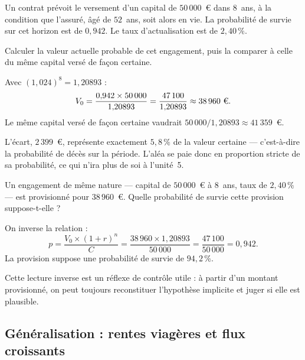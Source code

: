 \begin{exercice}
Un contrat prévoit le versement d'un capital de $50\,000$~\euro{} dans $8$~ans,
à la condition que l'assuré, âgé de $52$~ans, soit alors en vie. La probabilité
de survie sur cet horizon est de $0{,}942$. Le taux d'actualisation est de
$2{,}40\,\%$.

Calculer la valeur actuelle probable de cet engagement, puis la comparer à celle
du même capital versé de façon certaine.
\end{exercice}

\begin{corrige}
Avec $(1{,}024)^{8} = 1{,}20893$ :
\[
  V_0 = \frac{0{,}942 \times 50\,000}{1{,}20893}
      = \frac{47\,100}{1{,}20893} \approx 38\,960\ \text{\euro}.
\]
Le même capital versé de façon certaine vaudrait
$50\,000/1{,}20893 \approx 41\,359$~\euro.

\medskip
L'écart, $2\,399$~\euro, représente exactement $5{,}8\,\%$ de la valeur certaine
--- c'est-à-dire la probabilité de décès sur la période. L'aléa se paie donc en
proportion stricte de sa probabilité, ce qui n'ira plus de soi à l'unité~5.
\end{corrige}

\begin{exercice}
Un engagement de même nature --- capital de $50\,000$~\euro{} à $8$~ans, taux de
$2{,}40\,\%$ --- est provisionné pour $38\,960$~\euro. Quelle probabilité de
survie cette provision suppose-t-elle ?
\end{exercice}

\begin{corrige}
On inverse la relation :
\[
  p = \frac{V_0 \times (1+r)^{n}}{C}
    = \frac{38\,960 \times 1{,}20893}{50\,000}
    = \frac{47\,100}{50\,000} = 0{,}942 .
\]
La provision suppose une probabilité de survie de $94{,}2\,\%$.

Cette lecture inverse est un réflexe de contrôle utile : à partir d'un montant
provisionné, on peut toujours reconstituer l'hypothèse implicite et juger si
elle est plausible.
\end{corrige}

\subsection{Généralisation : rentes viagères et flux croissants}

